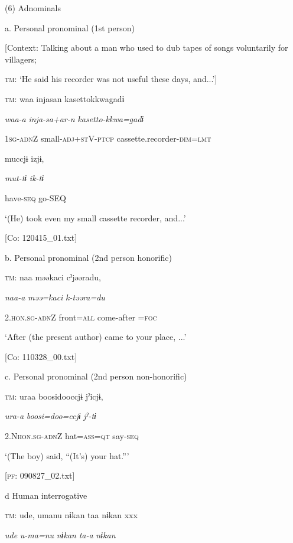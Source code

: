 (6)  Adnominals

  a.  Personal pronominal (1st person)

    [Context: Talking about a man who used to dub tapes of songs voluntarily for villagers;

\textsc{tm}: ‘He said his recorder was not useful these days, and...’]

    \textsc{tm}:  waa  injasan  {\textbar}kasetto{\textbar}kkwagadɨ

      \textit{waa-a}  \textit{inja-sa+ar-n}\textsubscript{} \textit{kasetto-kkwa=gadɨ}

      1\textsc{sg}-\textsc{adn}Z  small-\textsc{adj}+\textsc{st}V-\textsc{ptcp}  cassette.recorder-\textsc{dim}=\textsc{lmt}

      muccjɨ  izjɨ,

      \textit{mut-tɨ}  \textit{ik-tɨ}

      have-\textsc{seq}  go-SEQ

      ‘(He) took even my small cassette recorder, and...’

      [Co: 120415\_01.txt]

  b.  Personal pronominal (2nd person honorific)

    \textsc{tm}:  naa  məəkaci  cˀjəəradu,

      \textit{naa-a}  \textit{məə=kaci}  \textit{k-təəra=du}

      2.\textsc{hon}.\textsc{sg}-\textsc{adn}Z  front=\textsc{all}  come-after =\textsc{foc}

      ‘After (the present author) came to your place, ...’

      [Co: 110328\_00.txt]

  c.  Personal pronominal (2nd person non-honorific)

    \textsc{tm}:  uraa  {\textbar}boosi{\textbar}dooccjɨ  jˀicjɨ,

      \textit{ura-a}  \textit{boosi=doo=ccjɨ}  \textit{jˀ-tɨ}

      2.N\textsc{hon}.\textsc{sg}-\textsc{adn}Z  hat=\textsc{ass}=\textsc{qt}  say-\textsc{seq}

      ‘(The boy) said, “(It’s) your hat.”’

      [\textsc{pf}: 090827\_02.txt]

  d  Human interrogative

    \textsc{tm}:  ude,  umanu  nɨkan  taa  nɨkan  xxx

      \textit{ude}  \textit{u-ma=nu}  \textit{nɨkan}  \textit{ta-a}  \textit{nɨkan}  

